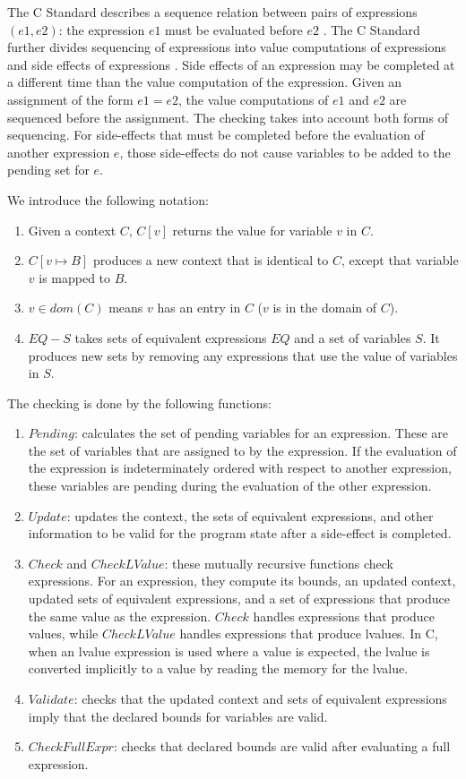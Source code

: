 The C Standard 
describes a sequence relation between pairs of expressions $(e1, e2)$:
the expression $e1$ must be evaluated before $e2$ \cite[Section 5.1.2.3]{ISO2011}.  
The C Standard
further divides sequencing of expressions into value computations
of expressions and side effects of expressions \cite[Section 6.5, pars. 1,2]{ISO2011}.
Side effects of an expression may be completed at a different time than the value
computation of the expression.
Given an assignment of the form $e1 = e2$, 
the value computations of $e1$ and $e2$ are sequenced before the
assignment. The checking takes into account both forms of sequencing.
For side-effects that must be completed before the evaluation of another
expression $e$, those side-effects do not cause variables to
be added to the pending set for $e$.

We introduce the following notation:
\begin{enumerate}
\item Given a context $C$, $C[v]$ returns the value for variable $v$ in $C$.
\item $C[v \mapsto B]$ produces a new context that is identical to $C$,
except that variable $v$ is mapped to $B$.
\item $v \in dom(C)$ means $v$ has an entry in $C$ ($v$ is in the domain of $C$).
\item $EQ - S$ takes sets of equivalent expressions $EQ$  and a set of variables
$S$.  It produces new sets by removing any expressions that use the value 
of variables in $S$.
\end{enumerate}

The checking is done by the following functions:
\begin{enumerate}
\item $Pending$: calculates the set of pending variables for
an expression.  These are the set of variables that are assigned
to by the expression.  If the evaluation of the expression is indeterminately
ordered with respect to another expression, these variables are
pending during the evaluation of the other expression.
\item $Update$: updates the context, the sets of equivalent expressions,
and other information to be valid for the program state after
a side-effect is completed.
\item $Check$ and $CheckLValue$:  these mutually recursive
functions check expressions.  For an expression, they compute
its bounds, an updated context, updated sets of equivalent expressions,
and a set of expressions that produce the same value as the expression.
$Check$ handles expressions that
produce values, while $CheckLValue$ handles expressions that produce
lvalues.  In C, when an lvalue expression is used where a value is
expected, the lvalue is converted implicitly to a value by
reading the memory for the lvalue.
\item $Validate$: checks that the updated context
and sets of equivalent expressions imply that the declared bounds for
variables are valid.
\item $CheckFullExpr$: checks that declared bounds are valid after
evaluating a full expression.  
\end{enumerate}

